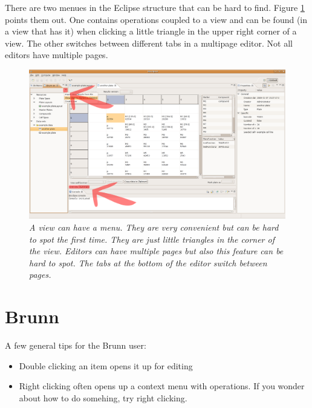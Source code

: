 \documentclass[a4paper,10pt]{article}
\begin{document}
            There are two menues in the Eclipse structure that can be
            hard to find. Figure \ref{viewMenu} points them out. One contains
            operations coupled to a view and can be found (in a view that has
            it) when clicking a little triangle in the upper right corner of a
            view. The other switches between different tabs in a multipage
            editor. Not all editors have multiple pages.
            \begin{figure}[htbp]
                \begin{center}
                    \includegraphics[width=1\textwidth]{images/twoMenues.png}
                \end{center}
                \caption{\textit{A view can have a menu. They are very
                    convenient but can be hard to spot the first time. They are
                    just little triangles in the corner of the view. Editors
                    can have multiple pages but also this feature can be hard
                    to spot. The tabs at the bottom of the editor switch
                    between pages.}}
                \label{viewMenu}
            \end{figure}

    \section{Brunn}
        
         A few general tips for the Brunn user:
         \begin{itemize}
             \item Double clicking an item opens it up for editing
             \item Right clicking often opens up a context menu with
                   operations. If you wonder about how to do somehing, try
                   right clicking.
         \end{itemize}
\end{document}
